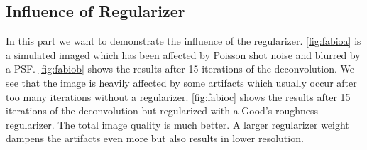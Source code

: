 \documentclass{juliacon}
\begin{document}
    \subsection{Influence of Regularizer}
        In this part we want to demonstrate the influence of the regularizer.
        \autoref{fig:fabioa} is a simulated imaged which has been affected by Poisson shot noise and blurred by a PSF.
        \autoref{fig:fabiob} shows the results after 15 iterations of the deconvolution. 
        We see that the image is heavily affected by some artifacts which usually occur after too many iterations without a regularizer.
        \autoref{fig:fabioc} shows the results after 15 iterations of the deconvolution but regularized with a Good's roughness regularizer.
        The total image quality is much better. A larger regularizer weight dampens the artifacts even more but also results in lower
        resolution.
\end{document}
